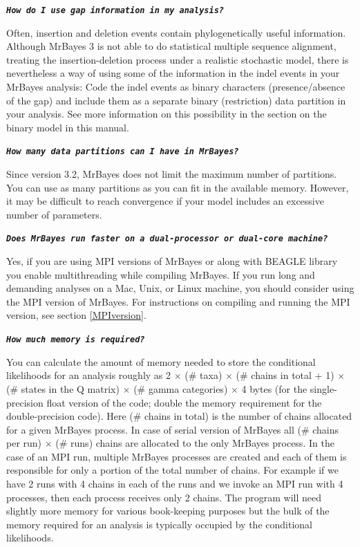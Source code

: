 \documentclass[12pt]{book}
\newcommand{\ttt}[1]{\texttt{#1}}
\newcommand{\tb}[1]{\ttt{\textbf{#1}}}
\begin{document}
\tb{\it{How do I use gap information in my analysis?}}

Often, insertion and deletion events contain phylogenetically useful information. Although MrBayes
3 is not able to do statistical multiple sequence alignment, treating the insertion-deletion
process under a realistic stochastic model, there is nevertheless a way of using some of the
information in the indel events in your MrBayes analysis: Code the indel events as binary
characters (presence/absence of the gap) and include them as a separate binary (restriction) data
partition in your analysis. See more information on this possibility in the section on the binary
model in this manual.

\tb{\it{How many data partitions can I have in MrBayes?}}

Since version 3.2, MrBayes does not limit the maximum number of partitions. You can use as many
partitions as you can fit in the available memory. However, it may be difficult to reach
convergence if your model includes an excessive number of parameters.

\tb{\it{Does MrBayes run faster on a dual-processor or dual-core machine?}}

Yes, if you are using MPI versions of MrBayes or along with BEAGLE library you enable
multithreading while compiling MrBayes. If you run long and demanding analyses on a Mac, Unix, or
Linux machine, you should consider using the MPI version of MrBayes. For instructions on compiling
and running the MPI version, see section \ref{MPIversion}.

\tb{\it{How much memory is required?}}

You can calculate the amount of memory needed to store the conditional likelihoods for an analysis
roughly as 2 $\times$ (\# taxa) $\times$ (\# chains in total + 1) $\times$ (\# states in the Q
matrix) $\times$ (\# gamma categories) $\times$ 4 bytes (for the single-precision float version of
the code; double the memory requirement for the double-precision code). Here (\# chains in total)
is the number of chains allocated for a given MrBayes process. In case of serial version of MrBayes
all (\# chains per run) $\times$ (\# runs) chains are allocated to the only MrBayes process. In the case
of an MPI run, multiple MrBayes processes are created and each of them is responsible for only a
portion of the total number of chains. For example if we have 2 runs with 4 chains in each of the
runs and we invoke an MPI run with 4 processes, then each process receives only 2 chains. The
program will need slightly more memory for various book-keeping purposes but the bulk of the memory
required for an analysis is typically occupied by the conditional likelihoods.
\end{document}
